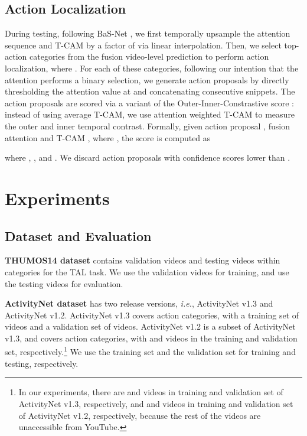 \documentclass[runningheads]{llncs}
\begin{document}
\subsection{Action Localization}
During testing, following BaS-Net \cite{lee2020background}, we first temporally upsample the attention sequence and T-CAM by a factor of  via linear interpolation. Then, we select top- action categories from the fusion video-level prediction  to perform action localization, where .
For each of these categories, following our intention that the attention performs a binary selection, we generate action proposals by directly thresholding the attention value at  and concatenating consecutive snippets. 
The action proposals are scored via a variant of the Outer-Inner-Constrastive score \cite{shou2018autoloc}: instead of using average T-CAM, we use attention weighted T-CAM to measure the outer and inner temporal contrast.
Formally, given action proposal , fusion attention  and T-CAM , where , the score  is computed as 

where , , and . We discard action proposals with confidence scores lower than .

\section{Experiments}


\subsection{Dataset and Evaluation}

\textbf{THUMOS14 dataset} \cite{jiang2014thumos} contains  validation videos and  testing videos within  categories for the TAL task. We use the  validation videos for training, and use the  testing videos for evaluation. 

\noindent\textbf{ActivityNet dataset} \cite{caba2015activitynet} has two release versions, \textit{i.e.}, ActivityNet v1.3 and ActivityNet v1.2. ActivityNet v1.3 covers  action categories, with a training set of  videos and a validation set of  videos.
ActivityNet v1.2 is a subset of ActivityNet v1.3, and covers  action categories, with  and  videos in the training and validation set, respectively.\footnote{In our experiments, there are  and  videos in training and validation set of ActivityNet v1.3, respectively, and  and  videos in training and validation set of ActivityNet v1.2, respectively, because the rest of the videos are unaccessible from YouTube.}
We use the training set and the validation set for training and testing, respectively.
\end{document}
